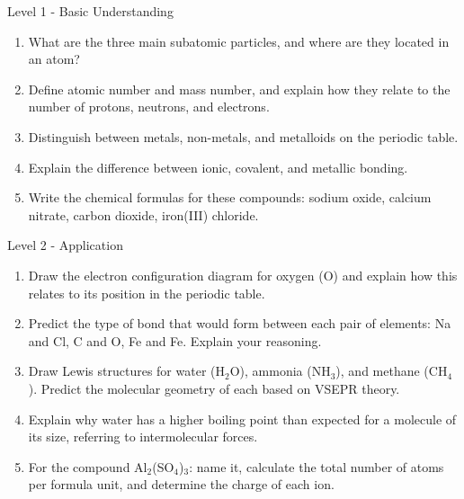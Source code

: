 \begin{tieredquestions}{Level 1 - Basic Understanding}
\begin{enumerate}
    \item What are the three main subatomic particles, and where are they located in an atom?
    \item Define atomic number and mass number, and explain how they relate to the number of protons, neutrons, and electrons.
    \item Distinguish between metals, non-metals, and metalloids on the periodic table.
    \item Explain the difference between ionic, covalent, and metallic bonding.
    \item Write the chemical formulas for these compounds: sodium oxide, calcium nitrate, carbon dioxide, iron(III) chloride.
\end{enumerate}
\end{tieredquestions}

\begin{tieredquestions}{Level 2 - Application}
\begin{enumerate}
    \item Draw the electron configuration diagram for oxygen (O) and explain how this relates to its position in the periodic table.
    \item Predict the type of bond that would form between each pair of elements: Na and Cl, C and O, Fe and Fe. Explain your reasoning.
    \item Draw Lewis structures for water (H$_2$O), ammonia (NH$_3$), and methane (CH$_4$). Predict the molecular geometry of each based on VSEPR theory.
    \item Explain why water has a higher boiling point than expected for a molecule of its size, referring to intermolecular forces.
    \item For the compound Al$_2$(SO$_4$)$_3$: name it, calculate the total number of atoms per formula unit, and determine the charge of each ion.
\end{enumerate}
\end{tieredquestions}

